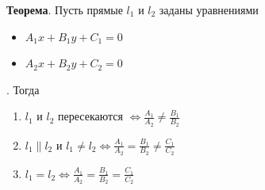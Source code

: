 \documentclass[a4paper]{article}
\begin{document}
    \begin{htheorem}
        \textbf{Теорема}. Пусть прямые $l_1$ и $l_2$ заданы уравнениями \begin{itemize}
                                                                            \item $A_1x+B_1y+C_1 = 0$
                                                                            \item $A_2x+B_2y+C_2 = 0$
        \end{itemize}. Тогда \begin{enumerate}
                                 \item $l_1$ и $l_2$ пересекаются $\displaystyle \Leftrightarrow \frac{A_1}{A_2} \neq \frac{B_1}{B_2}$
                                 \item $\displaystyle l_1 \parallel l_2$ и $\displaystyle l_1 \neq l_2 \Leftrightarrow \frac{A_1}{A_2} = \frac{B_1}{B_2} \neq \frac{C_1}{C_2}$
                                 \item $\displaystyle l_1 = l_2 \Leftrightarrow \frac{A_1}{A_2} = \frac{B_1}{B_2} = \frac{C_1}{C_2}$
        \end{enumerate}
    \end{htheorem}
\end{document}
